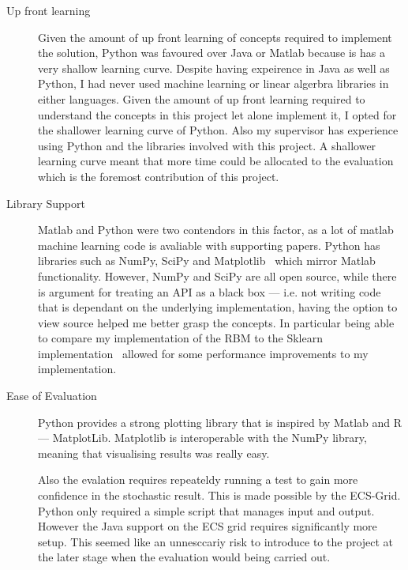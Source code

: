 \begin{description}
\item[Up front learning] Given the amount of up front learning of concepts required to implement the solution, Python was favoured over Java or Matlab because is has a very shallow learning curve. Despite having expeirence in Java as well as Python, I had never used machine learning or linear algerbra libraries in either languages. Given the amount of up front learning required to understand the concepts in this project let alone implement it, I opted for the shallower learning curve of Python. Also my supervisor has experience using Python and the libraries involved with this project. A shallower learning curve meant that more time could be allocated to the evaluation which is the foremost contribution of this project.
\item[Library Support] Matlab and Python were two contendors in this factor, as a lot of matlab machine learning code is avaliable with supporting papers. Python has libraries such as NumPy, SciPy and Matplotlib~\cite{2015HistSciPy} which mirror Matlab functionality. However, NumPy and SciPy are all open source, while there is argument for treating an API as a black box --- i.e. not writing code that is dependant on the underlying implementation, having the option to view source helped me better grasp the concepts. In particular being able to compare my implementation of the RBM to  the Sklearn implementation~\cite{scikit-learn} allowed for some performance improvements to my implementation.
\item[Ease of Evaluation] Python provides a strong plotting library that is inspired by Matlab and R --- MatplotLib. Matplotlib is interoperable with the NumPy library, meaning that visualising results was really easy.

Also the evalation requires repeateldy running a test to gain more confidence in the stochastic result. This is made possible by the ECS-Grid. Python only required a simple script that manages input and output. However the Java support on the ECS grid requires significantly more setup. This seemed like an unnesccariy risk to introduce to the project at the later stage when the evaluation would being carried out.
\end{description}
%


